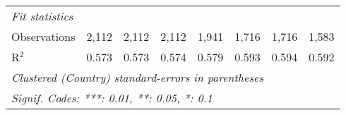 \begin{tabular}{lccccccc}
   \midrule \emph{Fit statistics}\\
   Observations                                                                                  & 2,112   & 2,112   & 2,112   & 1,941       & 1,716         & 1,716        & 1,583\\  
   R$^2$                                                                                         & 0.573   & 0.573   & 0.574   & 0.579       & 0.593         & 0.594        & 0.592\\  
   \midrule
   \multicolumn{8}{l}{\emph{Clustered (Country) standard-errors in parentheses}}\\
   \multicolumn{8}{l}{\emph{Signif. Codes: ***: 0.01, **: 0.05, *: 0.1}}\\
\end{tabular}
\par\endgroup



